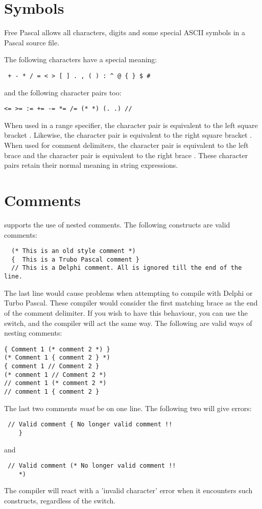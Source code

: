 \documentclass{report}
\begin{document}
\section{Symbols}
Free Pascal allows all characters, digits and some special ASCII symbols
in a Pascal source file.

The following characters have a special meaning:
\begin{verbatim}
 + - * / = < > [ ] . , ( ) : ^ @ { } $ #
\end{verbatim}
and the following character pairs too:
\begin{verbatim}
<= >= := += -= *= /= (* *) (. .) // 
\end{verbatim}
When used in a range specifier, the character pair  is equivalent to 
the left square bracket \var{[}. Likewise, the character pair  is 
equivalent to the right square bracket \var{]}. 
When used for comment delimiters, the character pair \var{(*} is equivalent 
to the  left brace \var{\{} and the character pair \var{*)} is equivalent 
to the right brace \var{\}}. 
These character pairs retain their normal meaning in string expressions.
\section{Comments}
\fpc supports the use of nested comments. The following constructs are valid
comments:
\begin{verbatim}
  (* This is an old style comment *)
  {  This is a Trubo Pascal comment }
  // This is a Delphi comment. All is ignored till the end of the line.
\end{verbatim}
The last line would cause problems when attempting to compile with Delphi or
Turbo Pascal. These compiler would consider the first matching brace 
\var{\}} as the end of the comment delimiter. If you wish to have this
behaviour, you can use the  switch, and the \fpc compiler will 
act the same way.
The following are valid ways of nesting comments:
\begin{verbatim}
{ Comment 1 (* comment 2 *) }
(* Comment 1 { comment 2 } *)
{ comment 1 // Comment 2 }
(* comment 1 // Comment 2 *)
// comment 1 (* comment 2 *)
// comment 1 { comment 2 }
\end{verbatim}
The last two comments {\em must} be on one line. The following two will give
errors:
\begin{verbatim}
 // Valid comment { No longer valid comment !!
    }                     
\end{verbatim}
and
\begin{verbatim}
 // Valid comment (* No longer valid comment !!
    *)                     
\end{verbatim}
The compiler will react with a 'invalid character' error when it encounters
such constructs, regardless of the  switch.
\end{document}
